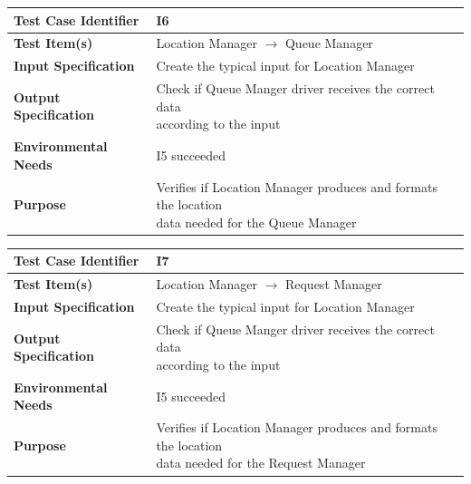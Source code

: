 \documentclass[11pt,titlepage]{article} %
\begin{document}
  \vspace{15cm}
  
  \begin{table}[ht!]
    \begin{tabular*}{16cm}{ll}
	\hline
	\textbf{Test Case Identifier} & I6\\
	\hline
	\textbf{Test Item(s)} & Location Manager $ \longrightarrow $ Queue Manager \\
	\hline
	\textbf{Input Specification} & Create the typical input for Location Manager\\
	\hline
	\textbf{Output Specification} & \pbox{20cm}{Check if Queue Manger driver receives the correct data \\ according to the input} \\
	\hline
	\textbf{Environmental Needs} & I5 succeeded \\
	\hline
	\textbf{Purpose} & \pbox{20cm}{Verifies if Location Manager produces and formats the location \\ data needed for the Queue Manager} \\
	\hline
    \end{tabular*}
  \end{table}
  
  \begin{table}[ht!]
    \begin{tabular*}{16cm}{ll}
	\hline
	\textbf{Test Case Identifier} & I7 \\
	\hline
	\textbf{Test Item(s)} & Location Manager $ \longrightarrow $ Request Manager \\
	\hline
	\textbf{Input Specification} & Create the typical input for Location Manager \\
	\hline
	\textbf{Output Specification} & \pbox{20cm}{Check if Queue Manger driver receives the correct data \\ according to the input} \\
	\hline
	\textbf{Environmental Needs} & I5 succeeded \\
	\hline
	\textbf{Purpose} & \pbox{20cm}{Verifies if Location Manager produces and formats the location \\ data needed for the Request Manager} \\
	\hline
    \end{tabular*}
  \end{table}
  
\end{document}
